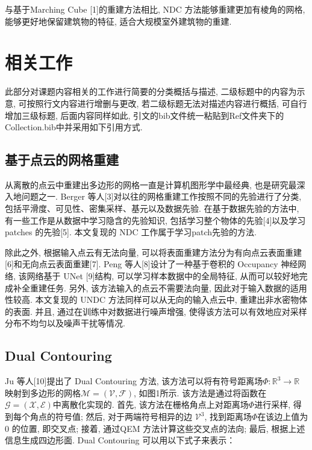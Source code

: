 与基于Marching Cube [1]的重建方法相比, NDC 方法能够重建更加有棱角的网格, 能够更好地保留建筑物的特征, 适合大规模室外建筑物的重建. 

\section{相关工作}
此部分对课题内容相关的工作进行简要的分类概括与描述, 二级标题中的内容为示意, 可按照行文内容进行增删与更改, 若二级标题无法对描述内容进行概括, 可自行增加三级标题, 后面内容同样如此, 引文的bib文件统一粘贴到Ref文件夹下的Collection.bib中并采用如下引用方式\cite{Runge}. 

\subsection{基于点云的网格重建}
从离散的点云中重建出多边形的网格一直是计算机图形学中最经典, 也是研究最深入地问题之一. Berger 等人[3]对以往的网格重建工作按照不同的先验进行了分类, 包括平滑度、可见性、密集采样、基元以及数据先验. 在基于数据先验的方法中, 有一些工作是从数据中学习隐含的先验知识, 包括学习整个物体的先验[4]以及学习 patches 的先验[5]. 本文复现的 NDC 工作属于学习patch先验的方法. 

除此之外, 根据输入点云有无法向量, 可以将表面重建方法分为有向点云表面重建[6]和无向点云表面重建[7]. Peng 等人[8]设计了一种基于卷积的 Occupancy 神经网络, 该网络基于 UNet [9]结构, 可以学习样本数据中的全局特征, 从而可以较好地完成补全重建任务. 另外, 该方法输入的点云不需要法向量, 因此对于输入数据的适用性较高. 本文复现的 UNDC 方法同样可以从无向的输入点云中, 重建出非水密物体的表面. 并且, 通过在训练中对数据进行噪声增强, 使得该方法可以有效地应对采样分布不均匀以及噪声干扰等情况. 

\subsection{Dual Contouring}
Ju 等人[10]提出了 Dual Contouring 方法, 该方法可以将有符号距离场$\Phi:\mathbb{R}^3\rightarrow \mathbb{R}$ 映射到多边形的网格$\mathcal{M=(V,F)}$, 如图1所示. 该方法是通过将函数在$\mathcal{G=(X,E)}$中离散化实现的. 首先, 该方法在栅格角点上对距离场$\Phi$进行采样, 得到每个角点的符号值; 然后, 对于两端符号相异的边 $\mathcal{V}^3$, 找到距离场$\Phi$在该边上值为 0 的位置, 即交叉点; 接着, 通过QEM 方法计算这些交叉点的法向; 最后, 根据上述信息生成四边形面. Dual Contouring 可以用以下式子来表示：\\

